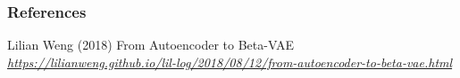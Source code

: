 



\begin{vbframe}
\frametitle{References}
\footnotesize{
\begin{thebibliography}{99}
 Lilian Weng (2018)
\newblock From Autoencoder to Beta-VAE
\newblock \emph{\url{https://lilianweng.github.io/lil-log/2018/08/12/from-autoencoder-to-beta-vae.html}}

\end{thebibliography}
}
\end{vbframe}

\endlecture


